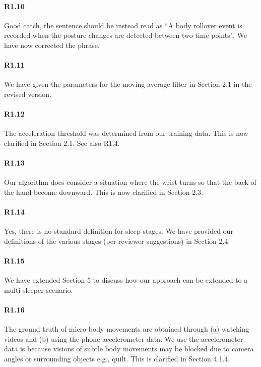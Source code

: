 \paragraph{R1.10} Good catch, the sentence should be instead read as ``A body rollover event is recorded when the posture changes are detected between
two time points". We have now corrected the phrase.

\paragraph{R1.11} We have given the parameters for the moving average filter in Section 2.1 in the revised version.

\paragraph{R1.12} The acceleration threshold was determined from our training data. This is now clarified in Section 2.1. See also
R1.4.

\vspace{-2mm}
\paragraph{R1.13} Our algorithm does consider a situation where the wrist turns so that the back of the hand become downward. This is now clarified in Section 2.3.

\paragraph{R1.14} Yes, there is no standard definition for sleep stages. We have provided our definitions of the various stages (per reviewer suggestions) in Section 2.4.

\paragraph{R1.15} We have extended Section 5 to discuss how our approach can be extended to a multi-sleeper scenario.

\paragraph{R1.16} The ground truth of micro-body movements are obtained through (a) watching videos and (b) using the phone accelerometer data. We use the accelerometer data is because visions of subtle body movements may be blocked due to camera angles or surrounding objects e.g., quilt. This is clarified in Section 4.1.4.

